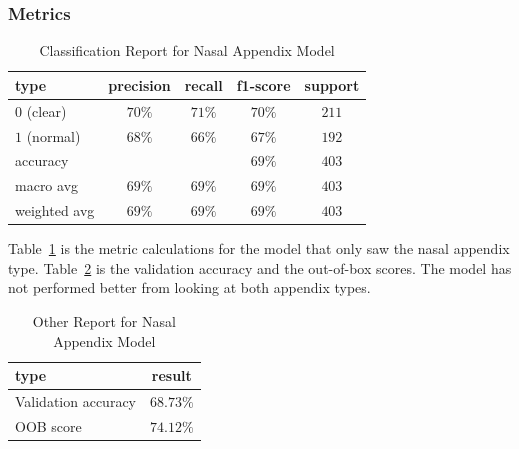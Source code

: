 \documentclass[12pt]{article}
\begin{document}
    \subsubsection{Metrics}
    \begin{table}[ht!]
        \centering
        \caption{Classification Report for Nasal Appendix Model}
        \label{table:nasal only}
        \begin{tabular}{|l|c|c|c|c|}
            \hline
            \textbf{type} & \textbf{precision} & \textbf{recall} & \textbf{f1-score} & \textbf{support} \\
            \hline
            \hline
            $0$ (clear)   & $70\%$             & $71\%$          & $70\%$            & $211$            \\
            \hline
            $1$ (normal)  & $68\%$             & $66\%$          & $67\%$            & $192$            \\
            \hline
            accuracy      &                    &                 & $69\%$            & $403$            \\
            \hline
            macro avg     & $69\%$             & $69\%$          & $69\%$            & $403$            \\
            \hline
            weighted avg  & $69\%$             & $69\%$          & $69\%$            & $403$            \\
            \hline
        \end{tabular}
    \end{table}
    Table~\ref{table:nasal only} is the metric calculations for the model that only
    saw the nasal appendix type. Table~\ref{table:other_results_nasal} is the
    validation accuracy and the out-of-box scores. The model has not performed better
    from looking at both appendix types.

    \begin{table}[ht!]
        \centering
        \caption{Other Report for Nasal Appendix Model}
        \label{table:other_results_nasal}
        \begin{tabular}{|l|c|}
            \hline
            \textbf{type}       & \textbf{result} \\
            \hline
            \hline
            Validation accuracy & $68.73\%$       \\
            \hline
            OOB score           & $74.12\%$       \\
            \hline
        \end{tabular}
    \end{table}
\end{document}
